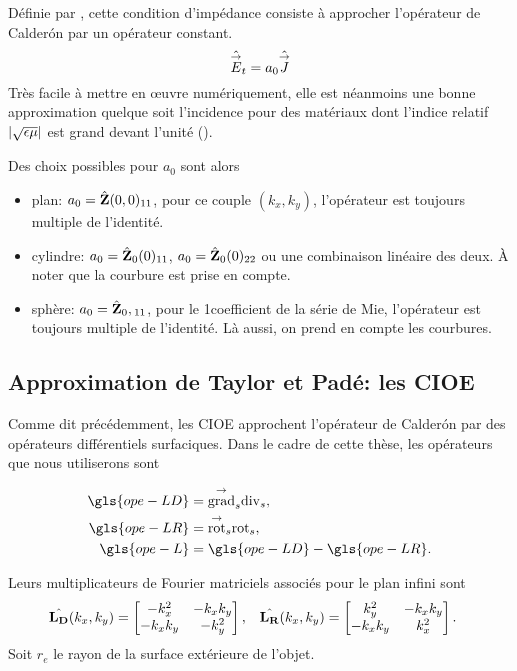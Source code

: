     Définie par \cite{leontovich_investigations_1948}, cette condition d'impédance consiste à approcher l'opérateur de Calderón par un opérateur constant.
    \[
      \hat{{\overset{\rightarrow}{E}}}_t = a_0 \hat {{\overset{\rightarrow}{J}}}
    \]
    Très facile à mettre en œuvre numériquement, elle est néanmoins une bonne approximation quelque soit l'incidence pour des matériaux dont l'indice relatif \(|\sqrt{\epsilon\mu}|\) est grand devant l'unité (\cite[par.~3, p.421-422]{senior_impedance_1960}).

    Des choix possibles pour \(a_0\) sont alors
    \begin{itemize}
      \item plan: \(a_0 = \hat{\mathbf{Z}}(0,0)_{11}\), pour ce couple \((k_x,k_y)\), l'opérateur est toujours multiple de l'identité.
      \item cylindre: \(a_0 = \hat{\mathbf{Z}}_0(0)_{11}\), \(a_0 = \hat{\mathbf{Z}}_0(0)_{22}\) ou une combinaison linéaire des deux. À noter que la courbure est prise en compte.
      \item sphère: \(a_0 = \hat{\mathbf{Z}}_0,{}_{11}\), pour le 1\ier coefficient de la série de Mie, l'opérateur est toujours multiple de l'identité. Là aussi, on prend en compte les courbures.
    \end{itemize}

  \subsection{Approximation de Taylor et Padé: les CIOE}

    Comme dit précédemment, les CIOE approchent l'opérateur de Calderón par des opérateurs différentiels surfaciques.
    Dans le cadre de cette thèse, les opérateurs que nous utiliserons sont

    \begin{align*}
      \gls{ope-LD} &= \tgrads \tdivs,
      \\
      \gls{ope-LR} &= \tvrots \trots,
      \\
      \gls{ope-L} &= \gls{ope-LD} - \gls{ope-LR}.
    \end{align*}

    Leurs multiplicateurs de Fourier matriciels associés pour le plan infini sont
    \begin{align*}
      \hat{\mathbf{L_D}}(k_x,k_y) &= \begin{bmatrix}-k_x^2 & -k_xk_y \\ -k_xk_y & -k_y^2\end{bmatrix}, &
      \hat{\mathbf{L_R}}(k_x,k_y) &= \begin{bmatrix}k_y^2 & -k_xk_y \\ -k_xk_y & k_x^2\end{bmatrix}.
    \end{align*}
    Soit \(r_e\) le rayon de la surface extérieure de l'objet.
      
